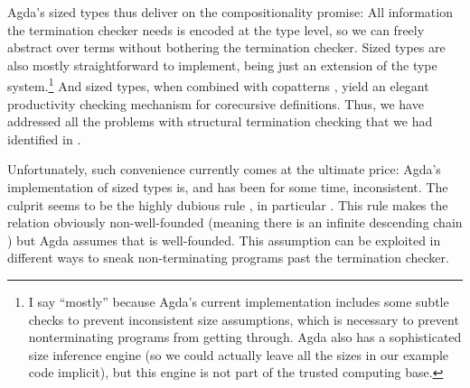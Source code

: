 Agda's sized types thus deliver on the compositionality promise: All information
the termination checker needs is encoded at the type level, so we can freely
abstract over terms without bothering the termination checker. Sized types are
also mostly straightforward to implement, being just an extension of the type
system.\footnote{I say \enquote{mostly} because Agda's current implementation
  includes some subtle checks to prevent inconsistent size assumptions, which is
  necessary to prevent nonterminating programs from getting through. Agda also
  has a sophisticated size inference engine (so we could actually leave all the
  sizes in our example code implicit), but this engine is not part of the
  trusted computing base.} And sized types, when combined with copatterns
\cite{abel2016}, yield an elegant productivity checking mechanism for
corecursive definitions. Thus, we have addressed all the problems with
structural termination checking that we had identified in
.

Unfortunately, such convenience currently comes at the ultimate price: Agda's
implementation of sized types is, and has been for some time, inconsistent. The
culprit seems to be the highly dubious rule , in particular
. This rule makes the \icode{<} relation obviously non-well-founded
(meaning there is an infinite descending chain ) but Agda
assumes that \icode{<} is well-founded. This assumption can be exploited in
different ways \cite{agdabug2015,agdabug2016,agdabug2017,agdabug2018} to sneak
non-terminating programs past the termination checker.
